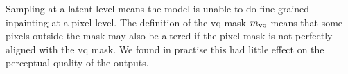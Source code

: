 Sampling at a latent-level means the model is unable to do fine-grained
inpainting at a pixel level. The definition of the \gls{vq} mask $m_\textrm{vq}$ means
that some pixels outside the mask may also be altered if the pixel mask is not
perfectly aligned with the \gls{vq} mask. We found in practise this had little
effect on the perceptual quality of the outputs.
